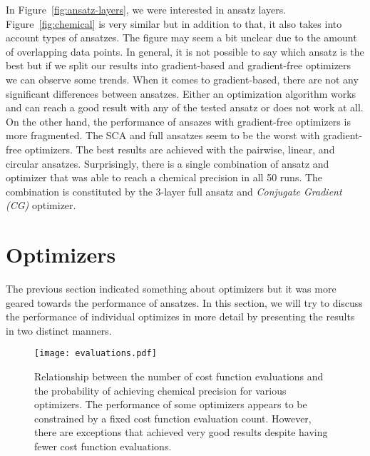 In Figure~\ref{fig:ansatz-layers}, we were interested in ansatz layers. Figure~\ref{fig:chemical} is very similar but in addition to that, it also takes into account types of ansatzes. The figure may seem a bit unclear due to the amount of overlapping data points. In general, it is not possible to say which ansatz is the best but if we split our results into gradient-based and gradient-free optimizers we can observe some trends. When it comes to gradient-based, there are not any significant differences between ansatzes. Either an optimization algorithm works and can reach a good result with any of the tested ansatz or does not work at all. On the other hand, the performance of ansazes with gradient-free optimizers is more fragmented. The SCA and full ansatzes seem to be the worst with gradient-free optimizers. The best results are achieved with the pairwise, linear, and circular ansatzes. Surprisingly, there is a single combination of ansatz and optimizer that was able to reach a chemical precision in all 50 runs. The combination is constituted by the 3-layer full ansatz and \textit{Conjugate Gradient (CG)} optimizer.

\section{Optimizers}
The previous section indicated something about optimizers but it was more geared towards the performance of ansatzes. In this section, we will try to discuss the performance of individual optimizes in more detail by presenting the results in two distinct manners.

\begin{figure}[H]
    \centering
    \texttt{[image: evaluations.pdf]}
    \caption{Relationship between the number of cost function evaluations and the probability of achieving chemical precision for various optimizers. The performance of some optimizers appears to be constrained by a fixed cost function evaluation count. However, there are exceptions that achieved very good results despite having fewer cost function evaluations.}
    \label{fig:evaluations}
\end{figure}

